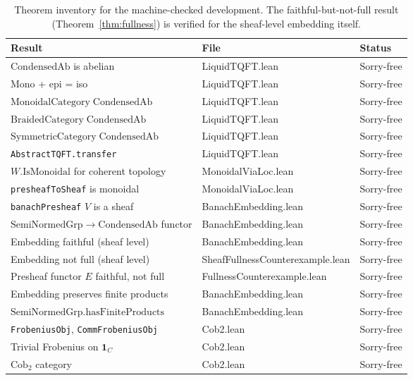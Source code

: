 \documentclass[11pt]{amsart}
\theoremstyle{plain}
\theoremstyle{definition}
\newcommand{\CondAb}{\mathrm{CondensedAb}}
\newcommand{\SemiNormedGrp}{\mathrm{SemiNormedGrp}}
\begin{document}
\begin{table}[h]
\centering
\small
\begin{tabular}{@{}lll@{}}
\toprule
\textbf{Result} & \textbf{File} & \textbf{Status} \\
\midrule
$\CondAb$ is abelian & LiquidTQFT.lean & Sorry-free \\
Mono + epi = iso & LiquidTQFT.lean & Sorry-free \\
$\mathrm{MonoidalCategory}\;\CondAb$ & LiquidTQFT.lean & Sorry-free \\
$\mathrm{BraidedCategory}\;\CondAb$ & LiquidTQFT.lean & Sorry-free \\
$\mathrm{SymmetricCategory}\;\CondAb$ & LiquidTQFT.lean & Sorry-free \\
\texttt{AbstractTQFT.transfer} & LiquidTQFT.lean & Sorry-free \\
$W.\mathrm{IsMonoidal}$ for coherent topology & MonoidalViaLoc.lean & Sorry-free \\
\texttt{presheafToSheaf} is monoidal & MonoidalViaLoc.lean & Sorry-free \\
\texttt{banachPresheaf} $V$ is a sheaf & BanachEmbedding.lean & Sorry-free \\
$\SemiNormedGrp \to \CondAb$ functor & BanachEmbedding.lean & Sorry-free \\
Embedding faithful (sheaf level) & BanachEmbedding.lean & Sorry-free \\
Embedding not full (sheaf level) & SheafFullnessCounterexample.lean & Sorry-free \\
Presheaf functor $E$ faithful, not full & FullnessCounterexample.lean & Sorry-free \\
Embedding preserves finite products & BanachEmbedding.lean & Sorry-free \\
$\SemiNormedGrp.\mathrm{hasFiniteProducts}$ & BanachEmbedding.lean & Sorry-free \\
\texttt{FrobeniusObj}, \texttt{CommFrobeniusObj} & Cob2.lean & Sorry-free \\
Trivial Frobenius on $\mathbf{1}_C$ & Cob2.lean & Sorry-free \\
$\mathrm{Cob}_2$ category & Cob2.lean & Sorry-free \\
\bottomrule
\end{tabular}
\caption{Theorem inventory for the machine-checked development. The faithful-but-not-full result (Theorem~\ref{thm:fullness}) is verified for the sheaf-level embedding itself.}
\label{tab:results}
\end{table}
\end{document}
